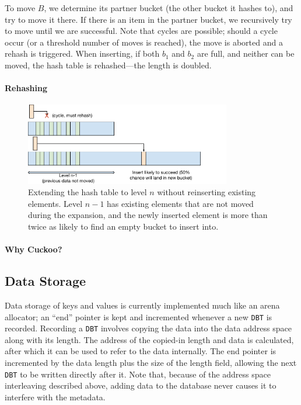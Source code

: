 To move $B$, we determine its partner bucket (the other bucket it hashes to),
and try to move it there. If there is an item in the partner bucket, we
recursively try to move until we are successful. Note that cycles are possible;
should a cycle occur (or a threshold number of moves is reached), the move is
aborted and a rehash is triggered. When inserting, if both $b_1$ and $b_2$ are
full, and neither can be moved, the hash table is rehashed---the length is
doubled.

\paragraph{Rehashing}





\begin{figure}
\centering
\hspace*{1mm}
\includegraphics[width=90mm]{fig/cuckoo_rehash}
\caption{Extending the hash table to level $n$ without reinserting existing
elements. Level $n-1$ has existing elements that are not moved during the
expansion, and the newly inserted element is more than twice as likely to find
an empty bucket to insert into.}
\label{fig:rehash}
\end{figure}






\paragraph{Why Cuckoo?}








\subsection{Data Storage}
\label{sec:ds}

Data storage of keys and values is currently implemented much like an arena
allocator; an ``end'' pointer is kept and incremented whenever a new \texttt{DBT} is
recorded. Recording a \texttt{DBT} involves copying the data into the data
address space along with its length. The address of the copied-in length and
data is calculated, after which it can be used to refer to the data internally.
The end pointer is incremented by the data length plus the size of the length
field, allowing the next \texttt{DBT} to be written directly after it. Note
that, because of the address space interleaving described above, adding data to
the database never causes it to interfere with the metadata.

